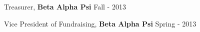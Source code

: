 Treasurer, \textbf{Beta Alpha Psi}	\hfill Fall - 2013


Vice President of Fundraising, \textbf{Beta Alpha Psi}	\hfill Spring - 2013


